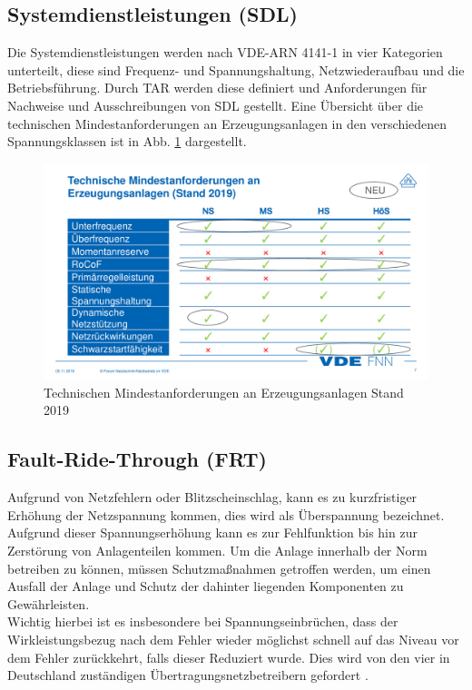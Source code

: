 	\subsection{Systemdienstleistungen (\gls{SDL})}
	Die Systemdienstleistungen werden nach VDE-ARN 4141-1 in vier Kategorien unterteilt, diese sind Frequenz- und Spannungshaltung, Netzwiederaufbau und die Betriebsführung. Durch \gls{TAR} werden diese definiert und Anforderungen für Nachweise und Ausschreibungen von \gls{SDL} gestellt. Eine Übersicht über die technischen Mindestanforderungen an Erzeugungsanlagen in den verschiedenen Spannungsklassen ist in Abb. \ref{fig:vde-fnn-tar} dargestellt.
	\begin{figure}
		\centering
		\includegraphics[width=0.9\linewidth]{content/Grafiken/VDE-FNN-TAR}
		\caption[Technischen Mindestanforderungen an Erzeugungsanlagen Stand 2019]{Technischen Mindestanforderungen an Erzeugungsanlagen Stand 2019 \cite{VDEFNN2019SDL}}
		\label{fig:vde-fnn-tar}
	\end{figure}
	
	
	
	
	\subsection{Fault-Ride-Through (\gls{FRT})}
	Aufgrund von Netzfehlern oder Blitzscheinschlag, kann es zu kurzfristiger Erhöhung der Netzspannung kommen, dies wird als Überspannung bezeichnet. Aufgrund dieser Spannungserhöhung kann es zur Fehlfunktion bis hin zur Zerstörung von Anlagenteilen kommen. Um die Anlage innerhalb der Norm betreiben zu können, müssen Schutzmaßnahmen getroffen werden, um einen Ausfall der Anlage und Schutz der dahinter liegenden Komponenten zu Gewährleisten.  \\
	
	Wichtig hierbei ist es insbesondere bei Spannungseinbrüchen, dass der Wirkleistungsbezug nach dem Fehler wieder möglichst schnell auf das Niveau vor dem Fehler zurückkehrt, falls dieser Reduziert wurde. Dies wird von den vier in Deutschland zuständigen Übertragungsnetzbetreibern gefordert \cite{4UNB}.


